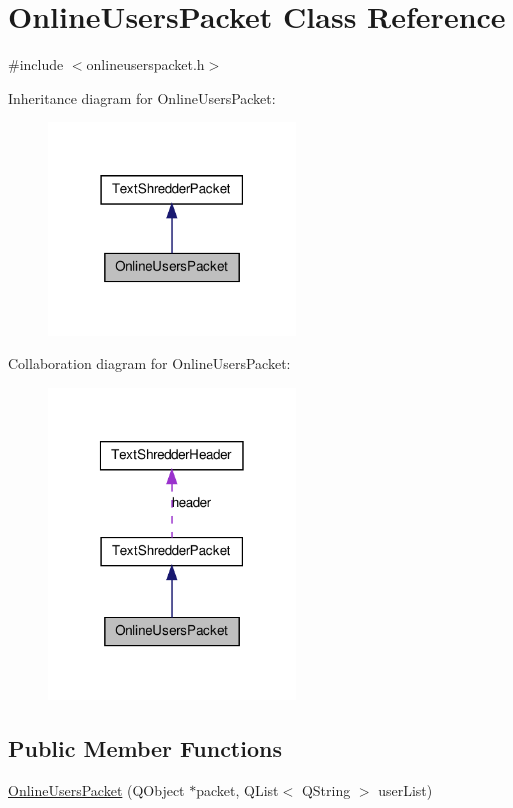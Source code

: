 \hypertarget{class_online_users_packet}{
\section{OnlineUsersPacket Class Reference}
\label{class_online_users_packet}
}


{\ttfamily \#include $<$onlineuserspacket.h$>$}



Inheritance diagram for OnlineUsersPacket:\nopagebreak
\begin{figure}[H]
\begin{center}
\leavevmode
\includegraphics[width=186pt]{class_online_users_packet__inherit__graph}
\end{center}
\end{figure}


Collaboration diagram for OnlineUsersPacket:\nopagebreak
\begin{figure}[H]
\begin{center}
\leavevmode
\includegraphics[width=186pt]{class_online_users_packet__coll__graph}
\end{center}
\end{figure}
\subsection*{Public Member Functions}
\begin{DoxyCompactItemize}
\item 
\hyperlink{class_online_users_packet_aa13dd8da86da4958e3419e98557abf4a}{OnlineUsersPacket} (QObject $\ast$packet, QList$<$ QString $>$ userList)
\end{DoxyCompactItemize}
